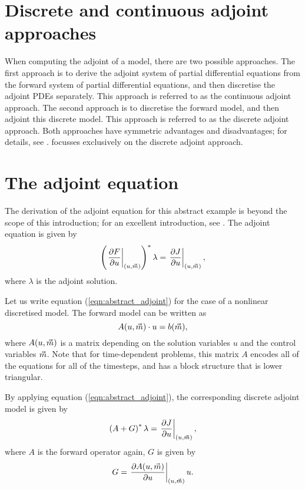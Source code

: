\section{Discrete and continuous adjoint approaches}
When computing the adjoint of a model, there are two possible approaches. The first approach is to derive the adjoint
system of partial differential equations from the forward system of partial differential equations, and then discretise
the adjoint PDEs separately. This approach is referred to as the continuous adjoint approach. The second approach is to discretise
the forward model, and then adjoint this discrete model. This approach is referred to as the discrete adjoint approach.
Both approaches have symmetric advantages and disadvantages; for details, see \citet{gunzburger2003}. \libadjoint focusses exclusively
on the discrete adjoint approach.

\section{The adjoint equation}
The derivation of the adjoint equation for this abstract example is beyond the scope of this introduction;
for an excellent introduction, see \citet{gunzburger2003}. The adjoint equation is given by
\begin{equation} \label{eqn:abstract_adjoint}
\left(\left.\frac{\partial F}{\partial u}\right|_{(u,{\vec{m}})}\right)^{*} \lambda = \left.\frac{\partial J}{\partial u}\right|_{(u,{\vec{m}})},
\end{equation}
where $\lambda$ is the adjoint solution.

Let us write equation (\ref{eqn:abstract_adjoint}) for the case of a nonlinear discretised model.
The forward model can be written as
\begin{equation}
A(u,{\vec{m}})\cdot u = b({\vec{m}}),
\end{equation}
where $A(u,{\vec{m}})$ is a matrix depending on the solution variables $u$ and the control variables ${\vec{m}}$. Note that for time-dependent problems,
this matrix $A$ encodes all of the equations for all of the timesteps, and has a block structure that is
lower triangular.

By applying equation (\ref{eqn:abstract_adjoint}), the corresponding discrete adjoint model is given by
\begin{equation} \label{eqn:discrete_adjoint}
\left(A + G\right)^{*}\lambda = \left.\frac{\partial J}{\partial u}\right|_{(u,{\vec{m}})},
\end{equation}
where $A$ is the forward operator again, $G$ is given by
\begin{equation}
G = \left.\frac{\partial A(u,{\vec{m}})}{\partial u}\right|_{(u,{\vec{m}})} u.
\end{equation}

